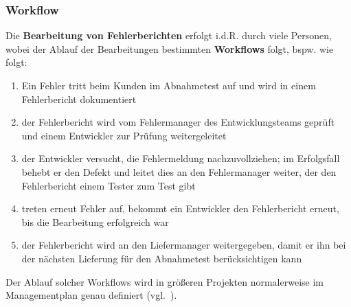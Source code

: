 \subsubsection*{Workflow}
Die \textbf{Bearbeitung von Fehlerberichten} erfolgt i.d.R. durch viele Personen, wobei der Ablauf der Bearbeitungen bestimmten \textbf{Workflows} folgt, bspw. wie folgt:

\begin{enumerate}
    \item Ein Fehler tritt beim Kunden im Abnahmetest auf und wird in einem Fehlerbericht dokumentiert
    \item der Fehlerbericht wird vom Fehlermanager des Entwicklungsteams geprüft und einem Entwickler zur Prüfung weitergeleitet
    \item der Entwickler versucht, die Fehlermeldung nachzuvollziehen; im Erfolgsfall behebt er den Defekt und leitet dies an den Fehlermanager weiter, der den Fehlerbericht einem Tester zum Test gibt
    \item treten erneut Fehler auf, bekommt ein Entwickler den Fehlerbericht erneut, bis die Bearbeitung erfolgreich war
    \item der Fehlerbericht wird an den Liefermanager weitergegeben, damit er ihn bei der nächsten Lieferung für den Abnahmetest berücksichtigen kann
\end{enumerate}

\noindent
Der Ablauf solcher Workflows wird in größeren Projekten normalerweise im Managementplan genau definiert (vgl.~\cite[76]{Wed09c}).
